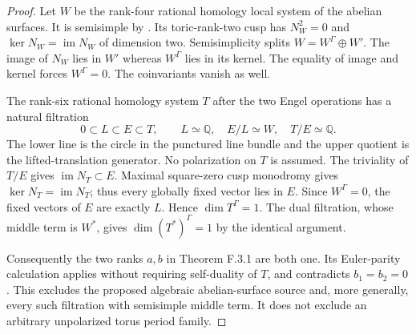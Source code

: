 \begin{proof}
Let $W$ be the rank-four rational homology local system of the
abelian surfaces.  It is semisimple by
\cite[Definition 4.2.4, Proposition 4.2.5 and Theorem 4.2.6]{ffDeligne}.
Its toric-rank-two cusp has
$N_W^2=0$ and $\ker N_W=\operatorname{im}N_W$ of dimension two.
Semisimplicity splits $W=W^\Gamma\oplus W'$.
The image of $N_W$ lies in $W'$ whereas $W^\Gamma$ lies in its
kernel.  The equality of image and kernel forces $W^\Gamma=0$.
The coinvariants vanish as well.

The rank-six rational homology system $T$ after the two Engel
operations has a natural filtration
\[
 0\subset L\subset E\subset T,\qquad
 L\simeq\mathbb Q,\quad E/L\simeq W,\quad T/E\simeq\mathbb Q.
\]
The lower line is the circle in the punctured line bundle and
the upper quotient is the lifted-translation generator.
No polarization on $T$ is assumed.
The triviality of $T/E$ gives $\operatorname{im}N_T\subset E$.
Maximal square-zero cusp monodromy gives
$\ker N_T=\operatorname{im}N_T$; thus every globally fixed vector
lies in $E$.  Since $W^\Gamma=0$, the fixed vectors of $E$ are
exactly $L$.  Hence $\dim T^\Gamma=1$.
The dual filtration, whose middle term is $W^*$, gives
$\dim(T^*)^\Gamma=1$ by the identical argument.

Consequently the two ranks $a,b$ in Theorem F.3.1 are both one.
Its Euler-parity calculation applies without requiring self-duality
of $T$, and contradicts $b_1=b_2=0$.
This excludes the proposed algebraic abelian-surface source and,
more generally, every such filtration with semisimple middle term.
It does not exclude an arbitrary unpolarized torus period family.
\end{proof}


























